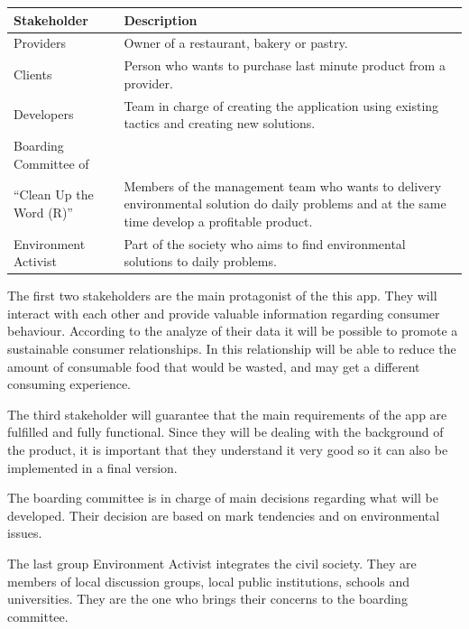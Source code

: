 \begin{table}[H]
    \begin{tabularx}{\textwidth}{lX}
    \toprule
    Stakeholder & Description   \\
    \midrule
    Providers & Owner of a restaurant, bakery or pastry. \\
    Clients & Person who wants to purchase last minute product from a provider. \\
    Developers & Team in charge of creating the application using existing tactics and creating new solutions. \\
    Boarding Committee of \\ ``Clean Up the Word (R)'' & Members of the management team who wants to delivery 
    environmental solution do daily problems and at the same time develop a profitable product.  \\
    Environment Activist & Part of the society who aims to find environmental solutions to daily problems. \\
    \bottomrule
    \end{tabularx}
\end{table}

The first two stakeholders are the main protagonist of the this app. They will interact with each other and provide valuable
information regarding consumer behaviour. According to the analyze of their data it will be possible to promote a sustainable
consumer relationships. In this relationship  will be able to reduce the amount of consumable food that
would be wasted, and  may get a different consuming experience.

The third stakeholder will guarantee that the main requirements of the app are fulfilled and fully functional. Since they will
be dealing with the background of the product, it is important that they understand it very good so it can also be implemented
in a final version.

The boarding committee is in charge of main decisions regarding what will be developed. Their decision are based on mark tendencies
and on environmental issues.

The last group Environment Activist integrates the civil society. They are members of local discussion groups, local public 
institutions, schools and universities. They are the one who brings their concerns to the boarding committee.